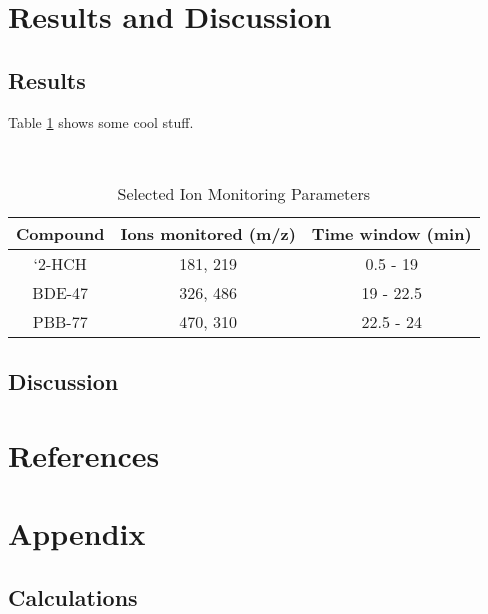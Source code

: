 \documentclass[a4paper, 12pt]{article}
\begin{document}
\section{Results and Discussion}

\subsection{Results}
Table \ref{tab-para} shows some cool stuff.

\begin{table}[h!]
	\centering
	\caption{Selected Ion Monitoring Parameters}
	\hfill \\
	\begin{tabular}{|c|c|c|}
		\hline
		Compound & Ions monitored (m/z) & Time window (min) \\
		\hline
		`2-HCH & 181, 219 & 0.5 - 19 \\
		\hline
		BDE-47 & 326, 486 & 19 - 22.5 \\
		\hline
		PBB-77 & 470, 310 & 22.5 - 24 \\
		\hline
	\end{tabular}
	\label{tab-para}
\end{table}


\subsection{Discussion}



\section{References}
\printbibliography


\section{Appendix}

\subsection{Calculations}
\end{document}
